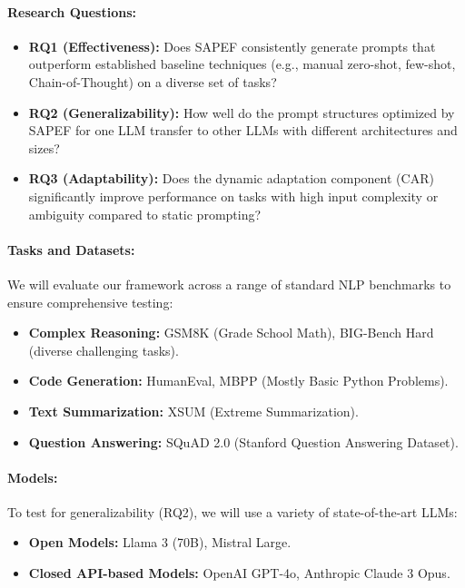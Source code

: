 \documentclass{article}
\begin{document}
\paragraph{Research Questions:}
\begin{itemize}
    \item \textbf{RQ1 (Effectiveness):} Does SAPEF consistently generate prompts that outperform established baseline techniques (e.g., manual zero-shot, few-shot, Chain-of-Thought) on a diverse set of tasks?
    \item \textbf{RQ2 (Generalizability):} How well do the prompt structures optimized by SAPEF for one LLM transfer to other LLMs with different architectures and sizes?
    \item \textbf{RQ3 (Adaptability):} Does the dynamic adaptation component (CAR) significantly improve performance on tasks with high input complexity or ambiguity compared to static prompting?
\end{itemize}

\paragraph{Tasks and Datasets:}
We will evaluate our framework across a range of standard NLP benchmarks to ensure comprehensive testing:
\begin{itemize}
    \item \textbf{Complex Reasoning:} GSM8K (Grade School Math), BIG-Bench Hard (diverse challenging tasks).
    \item \textbf{Code Generation:} HumanEval, MBPP (Mostly Basic Python Problems).
    \item \textbf{Text Summarization:} XSUM (Extreme Summarization).
    \item \textbf{Question Answering:} SQuAD 2.0 (Stanford Question Answering Dataset).
\end{itemize}

\paragraph{Models:}
To test for generalizability (RQ2), we will use a variety of state-of-the-art LLMs:
\begin{itemize}
    \item \textbf{Open Models:} Llama 3 (70B), Mistral Large.
    \item \textbf{Closed API-based Models:} OpenAI GPT-4o, Anthropic Claude 3 Opus.
\end{itemize}
\end{document}
